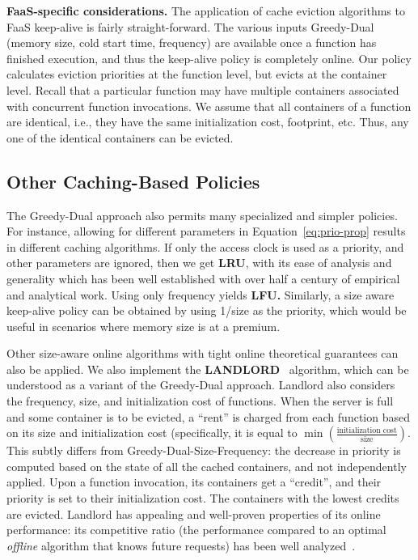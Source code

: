 \noindent \textbf{FaaS-specific considerations.}
The application of cache eviction algorithms to FaaS keep-alive is fairly straight-forward.
The various inputs Greedy-Dual (memory size, cold start time, frequency) are available once a function has finished execution, and thus the keep-alive policy is completely online. 
Our policy calculates eviction priorities at the function level, but evicts at the container level. 
Recall that a particular function may have multiple containers associated with concurrent function invocations. 
We assume that all containers of a function are identical, i.e., they have the same initialization cost, footprint, etc. 
Thus, any one of the identical containers can be evicted. 



\subsection{Other Caching-Based Policies}
\label{subsec:variants}

The Greedy-Dual approach also permits many specialized and simpler policies.
For instance, allowing for different parameters in Equation~\ref{eq:prio-prop} results in different caching algorithms.
If only the access clock is used as a priority, and other parameters are ignored, then we get \textbf{LRU}, with its ease of analysis and generality which has been well established with over half a century of empirical and analytical work. 
Using only frequency yields \textbf{LFU.}
Similarly, a size aware keep-alive policy can be obtained by using 1/size as the priority, which would be useful in scenarios where memory size is at a premium. 


Other size-aware online algorithms with tight online theoretical guarantees can also be applied.
We also implement the \textbf{LANDLORD}~\cite{young2002line} algorithm, which can be understood as a variant of the Greedy-Dual approach.
Landlord also considers the frequency, size, and initialization cost of functions.
When the server is full and some container is to be evicted, a ``rent'' is charged from each function based on its size and initialization cost (specifically, it is equal to $\min(\frac{\text{initialization cost}}{\text{size}})$.
This subtly differs from Greedy-Dual-Size-Frequency: the decrease in priority is computed based on the state of all the cached containers, and not independently applied. 
Upon a function invocation, its containers get a ``credit'', and their priority is set to their initialization cost. 
The containers with the lowest credits are evicted. 
Landlord has appealing and well-proven properties of its online performance: its competitive ratio (the performance compared to an optimal \emph{offline} algorithm that knows future requests) has been well analyzed~\cite{young2002line}. 




